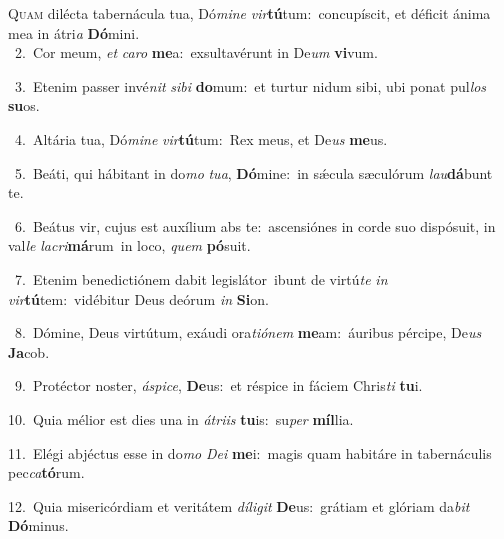 \lettrine{\initial\textcolor{\initialcolor}{Q}}{uam} dilécta tabernácula tua, Dó\-\textit{mi}\-\textit{ne} \textit{vir}\-\textbf{tú}tum:~\star concupíscit, et déficit ánima mea in átri\textit{a} \textbf{Dó}\-mini.\\
{\numbfont\textcolor{\numbcolor}{~2.}}~Cor meum, \textit{et} \textit{ca}\-\textit{ro} \textbf{me}\-a:~\star exsultavérunt in De\textit{um} \textbf{vi}\-vum.\par
{\numbfont\textcolor{\numbcolor}{~3.}}~Etenim passer invé\textit{nit} \textit{si}\-\textit{bi} \textbf{do}\-mum:~\star et turtur nidum sibi, ubi ponat pul\textit{los} \textbf{su}\-os.\par
{\numbfont\textcolor{\numbcolor}{~4.}}~Altária tua, Dó\-\textit{mi}\-\textit{ne} \textit{vir}\-\textbf{tú}tum:~\star Rex meus, et De\textit{us} \textbf{me}\-us.\par
{\numbfont\textcolor{\numbcolor}{~5.}}~Beáti, qui hábitant in do\textit{mo} \textit{tu}\-\textit{a}, \textbf{Dó}\-mine:~\star in sǽcula sæculórum \textit{lau}\-\textbf{dá}bunt te.\par
{\numbfont\textcolor{\numbcolor}{~6.}}~Beátus vir, cujus est auxílium abs te:~\dagger ascensiónes in corde suo dispósuit, in val\textit{le} \textit{la}\-\textit{cri}\textbf{má}rum~\star in loco, \textit{quem} \textbf{pó}\-suit.\par
{\numbfont\textcolor{\numbcolor}{~7.}}~Etenim benedictiónem dabit legislátor~\dagger ibunt de virtú\textit{te} \textit{in} \textit{vir}\-\textbf{tú}tem:~\star vidébitur Deus deórum \textit{in} \textbf{Si}\-on.\par
{\numbfont\textcolor{\numbcolor}{~8.}}~Dómine, Deus virtútum, exáudi ora\-\textit{ti}\-\textit{ó}\textit{nem} \textbf{me}\-am:~\star áuribus pércipe, De\textit{us} \textbf{Ja}\-cob.\par
{\numbfont\textcolor{\numbcolor}{~9.}}~Protéctor noster, \textit{á}\-\textit{spi}\textit{ce}, \textbf{De}\-us:~\star et réspice in fáciem Chris\textit{ti} \textbf{tu}\-i.\par
{\numbfont\textcolor{\numbcolor}{10.}}~Quia mélior est dies una in \textit{á}\-\textit{tri}\textit{is} \textbf{tu}\-is:~\star su\textit{per} \textbf{míl}\-lia.\par
{\numbfont\textcolor{\numbcolor}{11.}}~Elégi abjéctus esse in do\textit{mo} \textit{De}\-\textit{i} \textbf{me}\-i:~\star magis quam habitáre in tabernáculis pec\-\textit{ca}\-\textbf{tó}rum.\par
{\numbfont\textcolor{\numbcolor}{12.}}~Quia misericórdiam et veritátem \textit{dí}\-\textit{li}\textit{git} \textbf{De}\-us:~\star grátiam et glóriam da\textit{bit} \textbf{Dó}\-minus.\par
